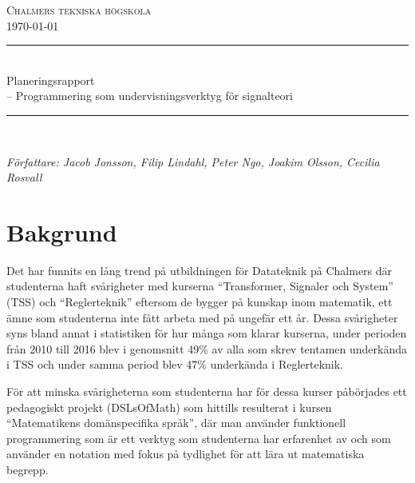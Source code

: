 \documentclass{article}
\begin{document}
\begin{titlepage} \newcommand{\HRule}{\rule{\linewidth}{0.3mm}}
\center
\textsc{\Large Chalmers tekniska högskola}\\[0.05cm] %
\normalsize \today

\HRule \\[0.08cm]
{ \large Planeringsrapport \\ \normalsize{-- Programmering som undervisningsverktyg för signalteori}}\\[0.08cm]
\HRule \\[0.3cm]

\begin{minipage}{0.5\textwidth}
\begin{flushleft} \small
\emph{Författare: Jacob Jonsson, Filip Lindahl, Peter Ngo, Joakim Olsson, Cecilia Rosvall}
\end{flushleft}

\end{minipage}


\end{titlepage}
\newpage
\tableofcontents
\newpage




\section{Bakgrund}
Det har funnits en lång trend på utbildningen för Datateknik på
Chalmers där studenterna haft svårigheter med kurserna “Transformer,
Signaler och System” (TSS) och “Reglerteknik”
eftersom de bygger på kunskap inom matematik, ett ämne som studenterna
inte fått arbeta med på ungefär ett år.
%
Dessa svårigheter syns bland annat i statistiken för hur många som
klarar kurserna, under perioden från 2010 till 2016 blev i genomsnitt
49\% av alla som skrev tentamen underkända i TSS och under samma
period blev 47\% underkända i Reglerteknik.

För att minska svårigheterna som studenterna har för dessa kurser
påbörjades ett pedagogiskt projekt (DSLsOfMath) som hittills
resulterat i kursen “Matematikens domänspecifika språk”, där man
använder funktionell programmering som är ett verktyg som
studenterna har erfarenhet av och som använder en notation med
fokus på tydlighet för att lära ut matematiska begrepp.
\end{document}
